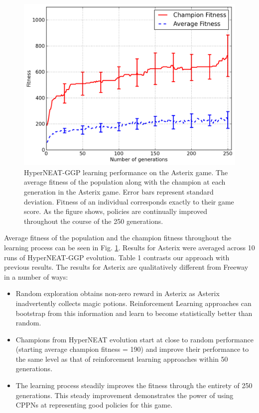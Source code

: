 \documentclass{sig-alternate}
\begin{document}
\begin{figure}[ht]
\begin{center}
\includegraphics[width=\columnwidth]{figures/asterix-results}
\end{center}
\caption{HyperNEAT-GGP learning performance on the Asterix game. The average fitness of the population along with the champion at each generation in the Asterix game. Error bars represent standard deviation. Fitness of an individual corresponds exactly to their game score. As the figure shows, policies are continually improved throughout the course of the 250 generations.}
\label{fig:asterix-curve}
\end{figure}

Average fitness of the population and the champion fitness throughout the learning process can be seen in Fig. \ref{fig:asterix-curve}. Results for Asterix were averaged across 10 runs of HyperNEAT-GGP evolution. Table 1 contrasts our approach with previous results. The results for Asterix are qualitatively different from Freeway in a number of ways:
\begin{itemize}
\item
Random exploration obtains non-zero reward in Asterix as Asterix inadvertently collects magic potions. Reinforcement Learning approaches can bootstrap from this information and learn to become statistically better than random.
\item
Champions from HyperNEAT evolution start at close to random performance (starting average champion fitness = 190) and improve their performance to the same level as that of reinforcement learning approaches within 50 generations. 
\item
The learning process steadily improves the fitness through the entirety of 250 generations. This steady improvement demonstrates the power of using CPPNs at representing good policies for this game.
\end{itemize}
\end{document}
